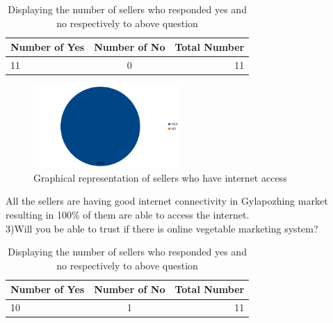 \documentclass[12pt]{report}
\begin{document}
\begin{normalsize}
\begin{table}[h]       %
		\centering
		\begin{tabular}{ | l | c | r | } \hline
		\textbf{Number of Yes} & \textbf{Number of No} & \textbf{Total Number} \\ \hline			
		11 & 0 & 11 \\ \hline
		\end{tabular}
		\caption{Displaying the number of sellers who responded yes and no respectively to above question}
		\label{2.0}
	\end{table}
\begin{figure}[h]       %
	\centering
	\includegraphics[width=0.5\textwidth]{seller 2.png} 
	\caption{Graphical representation of sellers who have internet access }
	\label{myLabel}		%
	\end{figure} 
\newpage 
All the sellers are having good internet connectivity in Gylapozhing market resulting in 100\% of them are able to access the internet.\newline\\[0.1cm]
3)Will you be able to trust if there is online vegetable marketing system?\newline\\[0.1cm]
\begin{table}[h]       %
		\centering
		\begin{tabular}{ | l | c | r | } \hline
		\textbf{Number of Yes} & \textbf{Number of No} & \textbf{Total Number} \\ \hline			
		10 & 1 & 11 \\ \hline
		\end{tabular}
		\caption{Displaying the number of sellers who responded yes and no respectively to above question}
		\label{3.0}
	\end{table}
\begin{figure}[h]       %

\end{figure}
\end{normalsize}
\end{document}
